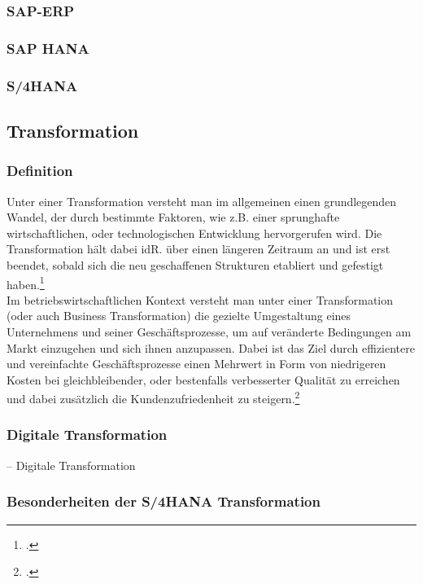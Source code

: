 \subsubsection{SAP-ERP}

\subsubsection{SAP HANA}

\subsubsection{S/4HANA}

\subsection{Transformation}
\subsubsection{Definition}
Unter einer Transformation versteht man im allgemeinen einen grundlegenden Wandel, der durch bestimmte Faktoren, wie z.B. einer sprunghafte wirtschaftlichen, oder technologischen Entwicklung hervorgerufen wird. Die Transformation hält dabei idR. über einen längeren Zeitraum an und ist erst beendet, sobald sich die neu geschaffenen Strukturen etabliert und gefestigt haben.\footcite[Vgl.][]{difu}\\ Im betriebswirtschaftlichen Kontext versteht man unter einer Transformation (oder auch Business Transformation) die gezielte Umgestaltung eines Unternehmens und seiner Geschäftsprozesse, um auf veränderte Bedingungen am Markt einzugehen und sich ihnen anzupassen. Dabei ist das Ziel durch effizientere und vereinfachte Geschäftsprozesse einen Mehrwert in Form von niedrigeren Kosten bei gleichbleibender, oder bestenfalls verbesserter Qualität zu erreichen und dabei zusätzlich die Kundenzufriedenheit zu steigern.\footcite[Vgl.][]{leanix}
\subsubsection{Digitale Transformation}
-- Digitale Transformation
\subsubsection{Besonderheiten der S/4HANA Transformation}
